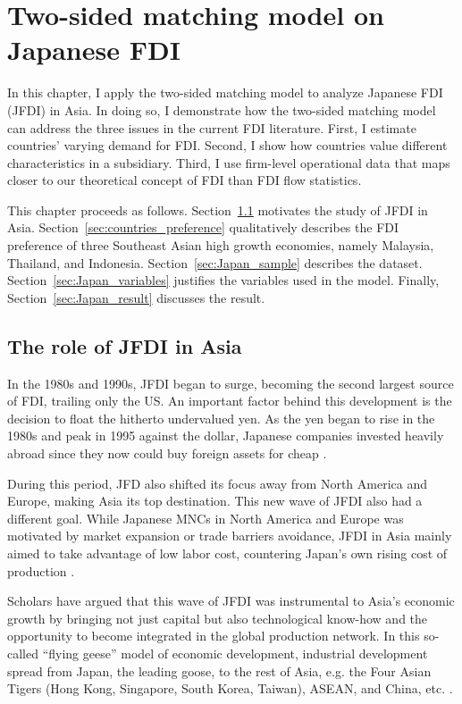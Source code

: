 \chapter{Two-sided matching model on Japanese FDI}
\label{chap:FDI}

In this chapter, I apply the two-sided matching model to analyze Japanese FDI (JFDI) in
Asia. In doing so, I demonstrate how the two-sided matching model can address
the three issues in the current FDI literature. First, I estimate
countries' varying demand for FDI. Second, I show how countries value
different characteristics in a subsidiary. Third, I use firm-level operational data that
maps closer to our theoretical concept of FDI than FDI flow statistics.

This chapter proceeds as follows. Section~\ref{sec:Japan_FDI_in_Asia} motivates
the study of JFDI in Asia. Section~\ref{sec:countries_preference}
qualitatively describes the FDI preference of three Southeast Asian high growth
economies, namely Malaysia, Thailand, and Indonesia.
Section~\ref{sec:Japan_sample} describes the dataset.
Section~\ref{sec:Japan_variables} justifies the variables used in the model.
Finally, Section~\ref{sec:Japan_result} discusses the result.

\section{The role of JFDI in Asia}
\label{sec:Japan_FDI_in_Asia}

In the 1980s and 1990s, JFDI began to surge, becoming the second largest
source of FDI, trailing only the US. An important factor behind
this development is the decision to float the hitherto undervalued yen. As the yen began
to rise in the 1980s and peak in 1995 against the dollar,
Japanese companies invested heavily abroad since they now could buy foreign assets
for cheap \citep{Delios2001}.

During this period, JFD also shifted its focus away from North America and
Europe, making Asia its top destination. This new wave of JFDI also had
a different goal. While Japanese MNCs in North America and Europe was motivated
by market expansion or trade barriers avoidance, JFDI in Asia mainly aimed to
take advantage of low labor cost, countering Japan's own rising cost of
production \citep[44]{Jomo1997}.

Scholars have argued that this wave of JFDI was instrumental to Asia's
economic growth by bringing not just capital but also technological know-how and
the opportunity to become integrated in the global production network. In this
so-called ``flying geese'' model of economic development, industrial development
spread from Japan, the leading goose, to the rest of Asia, e.g. the Four Asian
Tigers (Hong Kong, Singapore, South Korea, Taiwan), ASEAN, and China, etc.
\citep{Bernard1995, Kojima2000}.

